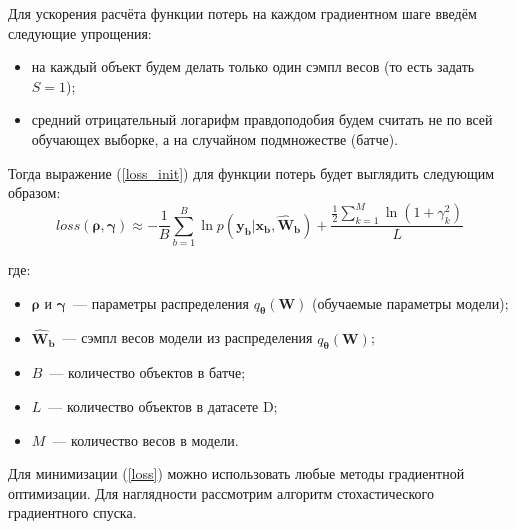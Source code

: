 \documentclass{article}
\numberwithin{equation}{section}
\begin{document}
    Для ускорения расчёта функции потерь на каждом градиентном шаге введём следующие упрощения:
    \begin{itemize}
        \item на каждый объект будем делать только один сэмпл весов (то есть задать $S=1$);
        \item средний отрицательный логарифм правдоподобия будем считать не по всей обучающех выборке,
            а на случайном подмножестве (батче).
    \end{itemize}

    Тогда выражение (\ref{loss_init}) для функции потерь будет выглядить следующим образом:
    \begin{equation}\label{loss}
        loss(\pmb{\rho}, \pmb{\gamma})
        \approx
            - \frac{1}{B}
            \sum_{b=1}^{B}
                {\ln{
                    p(\pmb{y_{b}} | \pmb{x_{b}}, \pmb{\hat{W}_{b}})
                }
            }
            +
            \frac
                {
                    \frac{1}{2} \sum_{k=1}^{M} \ln(
                        {1 + \gamma_{k}^{2}}
                    )
                }
                {L}
    \end{equation}

    где:
    \begin{itemize}
        \item $\pmb{\rho}$ и $\pmb{\gamma}$~--- параметры распределения
            $q_{\pmb{\theta}}(\pmb{W})$ (обучаемые параметры модели);
        \item $\pmb{\hat{W}_{b}}$~--- сэмпл весов модели из распределения
            $q_{\pmb{\theta}}(\pmb{W})$;
        \item $B$~--- количество объектов в батче;
        \item $L$~--- количество объектов в датасете D;
        \item $M$~--- количество весов в модели.
    \end{itemize}

    Для минимизации (\ref{loss}) можно использовать любые методы градиентной оптимизации.
    Для наглядности рассмотрим алгоритм стохастического градиентного спуска.
\end{document}
